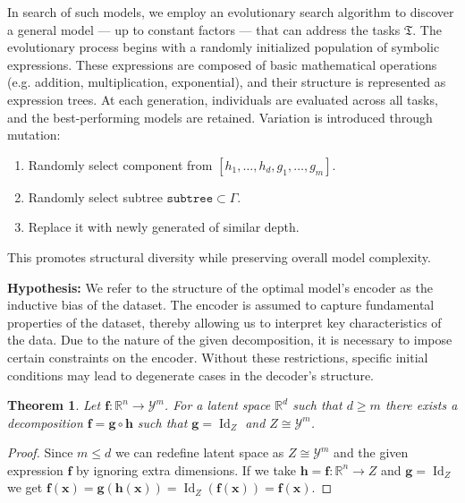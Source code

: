 \documentclass[14pt]{extarticle}
\newtheorem{theorem}{Theorem}[section]
\begin{document}
    In search of such models, we employ an evolutionary search algorithm to discover a general model — up to constant factors — that can address the tasks \(\mathfrak{T}\). The evolutionary process begins with a randomly initialized population of symbolic expressions. These expressions are composed of basic mathematical operations (e.g. addition, multiplication, exponential), and their structure is represented as expression trees. At each generation, individuals are evaluated across all tasks, and the best-performing models are retained. Variation is introduced through mutation:
    \begin{enumerate}
        \item Randomly select component from \([h_1, \dots, h_d, g_1, \dots, g_m]\).
        \item Randomly select subtree \(\texttt{subtree} \subset \Gamma\).
        \item Replace it with newly generated of similar depth. 
    \end{enumerate}
    This promotes structural diversity while preserving overall model complexity.

    \textbf{Hypothesis:} 
    We refer to the structure of the optimal model’s encoder as the inductive bias of the dataset. The encoder is assumed to capture fundamental properties of the dataset, thereby allowing us to interpret key characteristics of the data. Due to the nature of the given decomposition, it is necessary to impose certain constraints on the encoder. Without these restrictions, specific initial conditions may lead to degenerate cases in the decoder's structure.
    \begin{theorem}\label{bottleneck_dim}
        Let \(\mathbf{f}:\mathbb{R}^n \rightarrow \mathcal{Y}^m\). For a latent space \(\mathbb{R}^d\) such that \(d \ge m\) there exists a decomposition \(\mathbf{f} = \mathbf{g} \circ \mathbf{h}\) such that \(\mathbf{g} = \operatorname{Id}_Z\) and \(Z \cong \mathcal{Y}^m\).
    \end{theorem}
    \begin{proof}
        Since \(m \le d\) we can redefine latent space as \(Z \cong \mathcal{Y}^m\) and the given expression \(\mathbf{f}\) by ignoring extra dimensions. If we take \(\mathbf{h} = \mathbf{f} : \mathbb{R}^n \rightarrow Z\) and \(\mathbf{g} = \operatorname{Id}_{Z}\) we get \(\mathbf{f}(\mathbf{x}) = \mathbf{g}(\mathbf{h}(\mathbf{x})) = \operatorname{Id}_{Z} (\mathbf{f}(\mathbf{x})) = \mathbf{f}(\mathbf{x})\).
    \end{proof}
\end{document}
